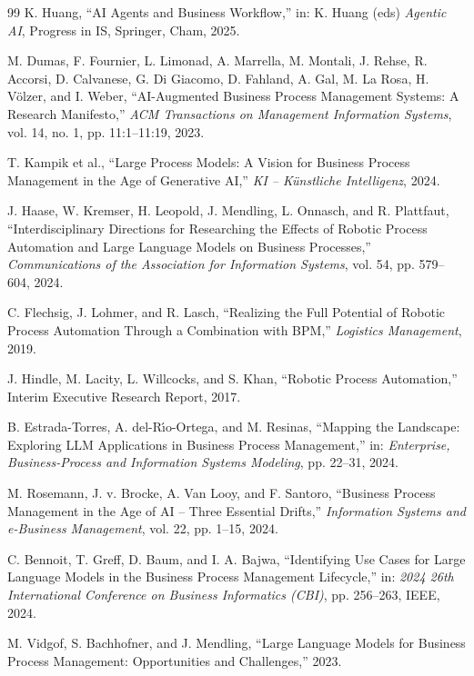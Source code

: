 \documentclass[11pt,a4paper]{article}
\begin{document}
\begin{thebibliography}{99}
K. Huang,
``AI Agents and Business Workflow,''
in: K. Huang (eds) \textit{Agentic AI}, Progress in IS, Springer, Cham, 2025.

M. Dumas, F. Fournier, L. Limonad, A. Marrella, M. Montali, J. Rehse, R. Accorsi, D. Calvanese, G. Di Giacomo, D. Fahland, A. Gal, M. La Rosa, H. V\"olzer, and I. Weber,
``AI-Augmented Business Process Management Systems: A Research Manifesto,''
\textit{ACM Transactions on Management Information Systems}, vol. 14, no. 1, pp. 11:1--11:19, 2023.

T. Kampik et al.,
``Large Process Models: A Vision for Business Process Management in the Age of Generative AI,''
\textit{KI -- K\"unstliche Intelligenz}, 2024.

J. Haase, W. Kremser, H. Leopold, J. Mendling, L. Onnasch, and R. Plattfaut,
``Interdisciplinary Directions for Researching the Effects of Robotic Process Automation and Large Language Models on Business Processes,''
\textit{Communications of the Association for Information Systems}, vol. 54, pp. 579--604, 2024.

C. Flechsig, J. Lohmer, and R. Lasch,
``Realizing the Full Potential of Robotic Process Automation Through a Combination with BPM,''
\textit{Logistics Management}, 2019.

J. Hindle, M. Lacity, L. Willcocks, and S. Khan,
``Robotic Process Automation,''
Interim Executive Research Report, 2017.

B. Estrada-Torres, A. del-R\'{\i}o-Ortega, and M. Resinas,
``Mapping the Landscape: Exploring LLM Applications in Business Process Management,''
in: \textit{Enterprise, Business-Process and Information Systems Modeling}, pp. 22--31, 2024.

M. Rosemann, J. v. Brocke, A. Van Looy, and F. Santoro,
``Business Process Management in the Age of AI -- Three Essential Drifts,''
\textit{Information Systems and e-Business Management}, vol. 22, pp. 1--15, 2024.

C. Bennoit, T. Greff, D. Baum, and I. A. Bajwa,
``Identifying Use Cases for Large Language Models in the Business Process Management Lifecycle,''
in: \textit{2024 26th International Conference on Business Informatics (CBI)}, pp. 256--263, IEEE, 2024.

M. Vidgof, S. Bachhofner, and J. Mendling,
``Large Language Models for Business Process Management: Opportunities and Challenges,''
2023.


\end{thebibliography}
\end{document}

